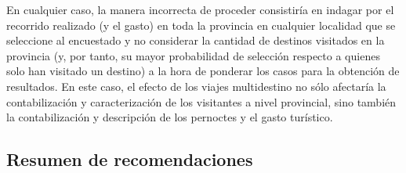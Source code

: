 \documentclass[
]{book}
\begin{document}
En cualquier caso, la manera incorrecta de proceder consistiría en indagar por el recorrido realizado (y el gasto) en toda la provincia en cualquier localidad que se seleccione al encuestado y no considerar la cantidad de destinos visitados en la provincia (y, por tanto, su mayor probabilidad de selección respecto a quienes solo han visitado un destino) a la hora de ponderar los casos para la obtención de resultados. En este caso, el efecto de los viajes multidestino no sólo afectaría la contabilización y caracterización de los visitantes a nivel provincial, sino también la contabilización y descripción de los pernoctes y el gasto turístico.

\hypertarget{resumen-de-recomendaciones}{%
\subsection{Resumen de recomendaciones}\label{resumen-de-recomendaciones}}
\end{document}
